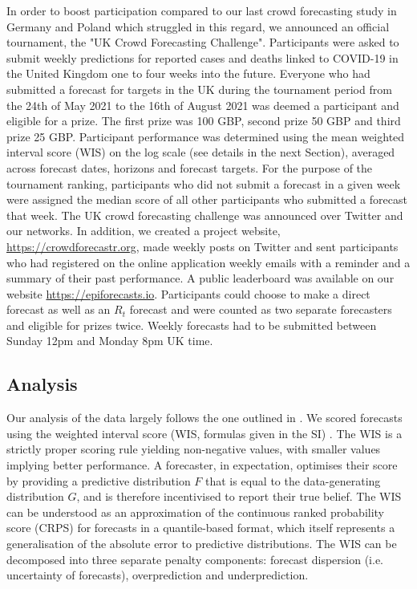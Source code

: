 \documentclass[10pt,a4paper,twocolumn]{article}
\begin{document}
In order to boost participation compared to our last crowd forecasting study in Germany and Poland \citep{bosseComparingHumanModelbased2022} which struggled in this regard, we announced an official tournament, the "UK Crowd Forecasting Challenge". Participants were asked to submit weekly predictions for reported cases and deaths linked to COVID-19 in the United Kingdom one to four weeks into the future. Everyone who had submitted a forecast for targets in the UK during the tournament period from the 24th of May 2021 to the 16th of August 2021 was deemed a participant and eligible for a prize. The first prize was 100 GBP, second prize 50 GBP and third prize 25 GBP. Participant performance was determined using the mean weighted interval score (WIS) on the log scale (see details in the next Section), %
averaged across forecast dates, horizons and forecast targets. For the purpose of the tournament ranking, participants who did not submit a forecast in a given week were assigned the median score of all other participants who submitted a forecast that week. The UK crowd forecasting challenge was announced over Twitter and our networks. 
In addition, we created a project website, \url{https://crowdforecastr.org}, made weekly posts on Twitter and sent participants who had registered on the online application weekly emails with a reminder and a summary of their past performance. A public leaderboard was available on our website \url{https://epiforecasts.io}. Participants could choose to make a direct forecast as well as an $R_t$ forecast and were counted as two separate forecasters and eligible for prizes twice. Weekly forecasts had to be submitted between Sunday 12pm and Monday 8pm UK time. 


\subsection*{Analysis}
\label{sec:analysis}

Our analysis of the data largely follows the one outlined in \citet{bosseComparingHumanModelbased2022}. We scored forecasts using the weighted interval score (WIS, formulas given in the SI) 
\cite{bracherEvaluatingEpidemicForecasts2021}. The WIS is a strictly proper scoring rule yielding non-negative values, with smaller values implying better performance. A forecaster, in expectation, optimises their score by providing a predictive distribution $F$ that is equal to the data-generating distribution $G$, and is therefore incentivised to report their true belief. The WIS can be understood as an approximation of the continuous ranked probability score (CRPS) for forecasts in a quantile-based format, which itself represents a generalisation of the absolute error to predictive distributions. The WIS can be decomposed into three separate penalty components: forecast dispersion (i.e. uncertainty of forecasts), overprediction and underprediction.
\end{document}
